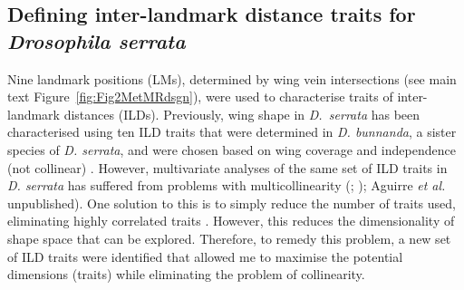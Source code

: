 

\subsection{Defining inter-landmark distance traits for \textit{Drosophila serrata}}

Nine landmark positions (LMs), determined by wing vein intersections (see main text Figure~\ref{fig:Fig2MetMRdsgn}), were used to characterise traits of inter-landmark distances (ILDs). Previously, wing shape in \textit{D.~serrata} has been characterised \citep{McGu15, Szte15} using ten ILD traits that were determined in \textit{D. bunnanda}, a sister species of \textit{D. serrata}, and were chosen based on wing coverage and independence (not collinear) \citep{McGu07}. However, multivariate analyses of the same set of ILD traits in \textit{D. serrata} has suffered from problems with multicollinearity (\citealp{Szte15}; \citealp{Duga21}); Aguirre \textit{et al.} unpublished). One solution to this is to simply reduce the number of traits used, eliminating highly correlated traits \citep[e.g.][]{Szte15}. However, this reduces the dimensionality of shape space that can be explored. Therefore, to remedy this problem, a new set of ILD traits were identified that allowed me to maximise the potential dimensions (traits) while eliminating the problem of collinearity. \par


